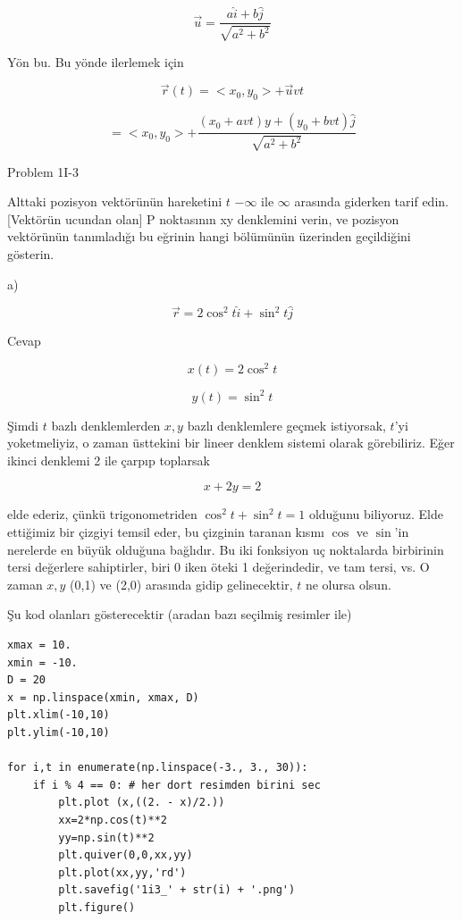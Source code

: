 \documentclass[12pt,fleqn]{article}\usepackage{../../common}
\begin{document}
$$ \vec{u} = \frac{a\hat{i}+b\hat{j}}{\sqrt{a^2+b^2}} $$

Yön bu. Bu yönde ilerlemek için 

$$ \vec{r}(t) = < x_0,y_0 > + \vec{u}vt $$

$$  = < x_0,y_0 > + \frac{(x_0+avt)y+(y_0 + bvt)\hat{j}}{\sqrt{a^2+b^2}}$$

Problem 1I-3

Alttaki pozisyon vektörünün hareketini $t$ $-\infty$ ile $\infty$ arasında
giderken tarif edin. [Vektörün ucundan olan] P noktasının xy denklemini
verin, ve pozisyon vektörünün tanımladığı bu eğrinin hangi bölümünün
üzerinden geçildiğini gösterin. 

a) 

$$ \vec{r} = 2\cos^2t \hat{i} + \sin^2t \hat{j}  $$

Cevap

$$ x(t) = 2\cos^2t $$

$$ y(t) = \sin^2t $$

Şimdi $t$ bazlı denklemlerden $x,y$ bazlı denklemlere geçmek istiyorsak, $t$'yi
yoketmeliyiz, o zaman üsttekini bir lineer denklem sistemi olarak
görebiliriz. Eğer ikinci denklemi 2 ile çarpıp toplarsak

$$ x + 2y = 2 $$

elde ederiz, çünkü trigonometriden $\cos^2t + \sin^2t = 1$ olduğunu
biliyoruz. Elde ettiğimiz bir çizgiyi temsil eder, bu çizginin taranan kısmı
$\cos$ ve $\sin$'in nerelerde en büyük olduğuna bağlıdır. Bu iki fonksiyon uç
noktalarda birbirinin tersi değerlere sahiptirler, biri 0 iken öteki 1
değerindedir, ve tam tersi, vs. O zaman $x,y$ (0,1) ve (2,0) arasında gidip
gelinecektir, $t$ ne olursa olsun.

Şu kod olanları gösterecektir (aradan bazı seçilmiş resimler ile)

\begin{verbatim}
xmax = 10.
xmin = -10.
D = 20
x = np.linspace(xmin, xmax, D)
plt.xlim(-10,10)
plt.ylim(-10,10)

for i,t in enumerate(np.linspace(-3., 3., 30)):
    if i % 4 == 0: # her dort resimden birini sec
        plt.plot (x,((2. - x)/2.))
        xx=2*np.cos(t)**2
        yy=np.sin(t)**2
        plt.quiver(0,0,xx,yy)
        plt.plot(xx,yy,'rd')
        plt.savefig('1i3_' + str(i) + '.png')
        plt.figure()
\end{verbatim}
\end{document}
